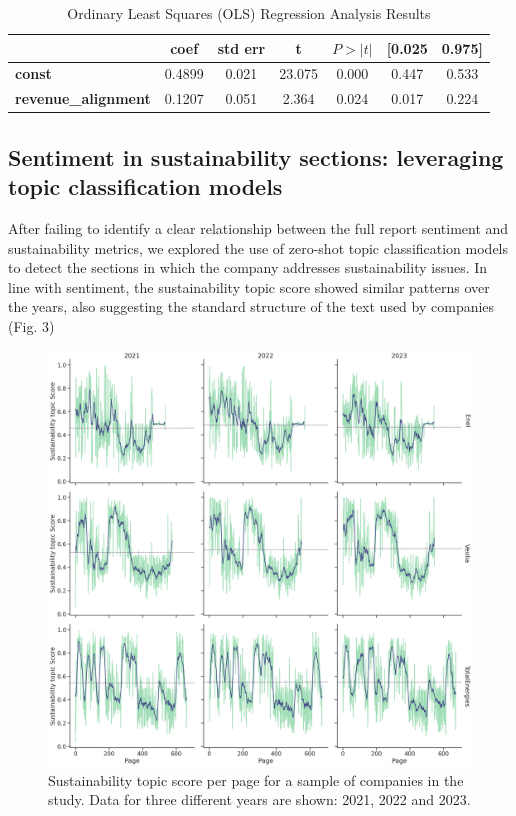 \documentclass[times]{oupau}
\begin{document}
\begin{table}[ht]
\caption{Ordinary Least Squares (OLS) Regression Analysis Results}
\centering
\begin{tabular}{lcccccc}
\hline
\textbf{} & \textbf{coef} & \textbf{std err} & \textbf{t} & \textbf{$P>|t|$} & \textbf{[0.025} & \textbf{0.975]} \\
\hline
\textbf{const} & 0.4899 & 0.021 & 23.075 & 0.000 & 0.447 & 0.533 \\
\textbf{revenue\_alignment} & 0.1207 & 0.051 & 2.364 & 0.024 & 0.017 & 0.224 \\
\hline
\end{tabular}
\label{tab:revenue_alignment_results}
\end{table}

\subsection{Sentiment in sustainability sections: leveraging topic classification models}
After failing to identify a clear relationship between the full report sentiment and sustainability metrics, we explored the use of zero-shot topic classification models to detect the sections in which the company addresses sustainability issues. In line with sentiment, the sustainability topic score showed similar patterns over the years, also suggesting the standard structure of the text used by companies (Fig. 3)
\par
\justify
\clearpage
\begin{figure} [h]
    \centering
    \includegraphics[width=1\linewidth]{pages2.png}
    \caption{Sustainability topic score per page for a sample of companies in the study. Data for three different years are shown: 2021, 2022 and 2023.}
    \label{fig:enter-label}
\end{figure}
\end{document}
